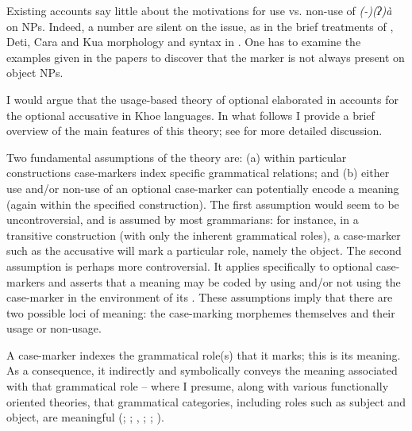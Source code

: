 \documentclass[output=paper]{LSP/langsci}
\begin{document}

Existing accounts say little about the motivations for use vs. non-use of \textit{(-)(ʔ)à} on  NPs. Indeed, a number are silent on the issue, as in the brief treatments of , Deti, Cara and Kua morphology and syntax in \citet{Vossen2013SyntaxShua}. One has to examine the examples given in the papers to discover that the marker is not always present on object NPs.

I would argue that the usage-based theory of optional  elaborated in \eg \citet{McGregor2010Optional,McGregor2013Optionality} accounts for the optional accusative in Khoe languages. In what follows I provide a brief overview of the main features of this theory; see \citet{McGregor2006Focal,McGregor2010Optional,McGregor2013Optionality} for more detailed discussion.

Two fundamental assumptions of the theory are: (a) within particular constructions case-markers index specific grammatical relations; and (b) either use and/or non-use of an optional case-marker can potentially encode a meaning (again within the specified construction). The first assumption would seem to be uncontroversial, and is assumed by most grammarians: for instance, in a transitive construction (with only the inherent grammatical roles), a case-marker such as the accusative will mark a particular role, namely the object. The second assumption is perhaps more controversial. It applies specifically to optional case-markers and asserts that a meaning may be coded by using and/or not using the case-marker in the environment of its . These assumptions imply that there are two possible loci of meaning: the case-marking morphemes themselves and their usage or non-usage.

A case-marker indexes the grammatical role(s) that it marks; this is its meaning. As a consequence, it indirectly and symbolically conveys the meaning associated with that grammatical role – where I presume, along with various functionally oriented theories, that grammatical categories, including roles such as subject and object, are meaningful (\eg \citealt{Haas1954Defining}; \citealt[30–32]{Halliday1985Introduction}; \citealt[275, 316]{Langacker1987Foundations}, \citeyear[289]{Langacker1991Cognitive}; \citealt[27]{Shaumyan1987Semiotic}; \citealt[2]{McGregor1997Semiotic}).
\end{document}
